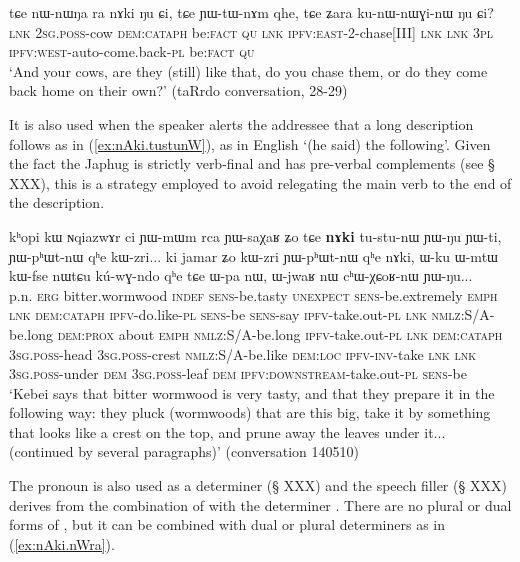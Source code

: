 \begin{exe}
\ex \label{ex:nAki.Nu.Ci}
 \gll 
tɕe nɯ-nɯŋa ra nɤki ŋu ɕi, tɕe ɲɯ-tɯ-nɤm qhe, tɕe ʑara ku-nɯ-nɯɣi-nɯ ŋu ɕi? \\
\textsc{lnk} \textsc{2sg}.\textsc{poss}-cow \textsc{dem}:\textsc{cataph} be:\textsc{fact} \textsc{qu} \textsc{lnk} \textsc{ipfv:east}-2-chase[III] \textsc{lnk} \textsc{lnk} \textsc{3pl} \textsc{ipfv:west}-auto-come.back-\textsc{pl} be:\textsc{fact} \textsc{qu} \\
\glt `And your cows, are they (still) like that, do you chase them, or do they come back home on their own?' (taRrdo conversation, 28-29)
\end{exe}
It is also used  when the speaker alerts the addressee that a long description follows as in (\ref{ex:nAki.tustunW}), as in English `(he said) the following'. Given the fact the Japhug is strictly verb-final and has pre-verbal complements (see § XXX), this is a strategy employed to avoid relegating the main verb to the end of the description.

 \begin{exe}
\ex \label{ex:nAki.tustunW}
 \gll
kʰopi kɯ ɴqiazwɤr ci ɲɯ-mɯm rca ɲɯ-saχaʁ ʑo tɕe \textbf{nɤki} tu-stu-nɯ ɲɯ-ŋu ɲɯ-ti, ɲɯ-pʰɯt-nɯ qʰe kɯ-zri... ki jamar ʑo kɯ-zri ɲɯ-pʰɯt-nɯ qʰe nɤki, ɯ-ku ɯ-mtɯ kɯ-fse nɯtɕu kú-wɣ-ndo qʰe tɕe ɯ-pa nɯ, ɯ-jwaʁ nɯ cʰɯ-χɕoʁ-nɯ ɲɯ-ŋu...  \\
p.n. \textsc{erg} bitter.wormwood \textsc{indef} \textsc{sens}-be.tasty \textsc{unexpect} \textsc{sens}-be.extremely \textsc{emph} \textsc{lnk} \textsc{dem:cataph} \textsc{ipfv}-do.like-\textsc{pl} \textsc{sens}-be \textsc{sens}-say \textsc{ipfv}-take.out-\textsc{pl} \textsc{lnk} \textsc{nmlz}:S/A-be.long \textsc{dem:prox} about \textsc{emph} \textsc{nmlz}:S/A-be.long \textsc{ipfv}-take.out-\textsc{pl} \textsc{lnk} \textsc{dem:cataph} \textsc{3sg.poss}-head  \textsc{3sg.poss}-crest \textsc{nmlz}:S/A-be.like  \textsc{dem:loc} \textsc{ipfv-inv}-take \textsc{lnk} \textsc{lnk} \textsc{3sg.poss}-under \textsc{dem}  \textsc{3sg.poss}-leaf \textsc{dem} \textsc{ipfv:downstream}-take.out-\textsc{pl}  \textsc{sens}-be \\
\glt `Kebei says that bitter wormwood is very tasty, and that they prepare it in the following way: they pluck (wormwoods) that are this big, take it by something that looks like a crest on the top, and prune away the leaves under it... (continued by several paragraphs)' (conversation 140510)
\end{exe}

The pronoun  is also used as a determiner (§ XXX) and the speech filler  (§ XXX) derives from the combination of    with the determiner . There are no plural or dual forms of , but it can be combined with dual or plural determiners as in (\ref{ex:nAki.nWra}).

